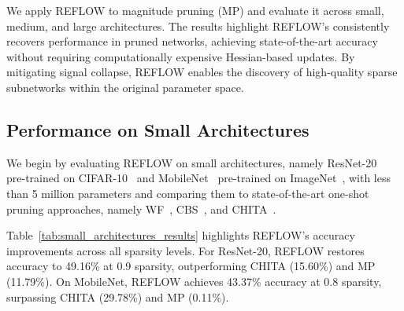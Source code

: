 We apply REFLOW to magnitude pruning (MP) and evaluate it across small, medium, and large architectures. The results highlight REFLOW’s consistently recovers performance in pruned networks, achieving state-of-the-art accuracy without requiring computationally expensive Hessian-based updates. By mitigating signal collapse, REFLOW enables the discovery of high-quality sparse subnetworks within the original parameter space.

\subsection{Performance on Small Architectures}
We begin by evaluating REFLOW on small architectures, namely ResNet-20~\cite{RESNET} pre-trained on CIFAR-10~\cite{CIFAR10} and MobileNet~\cite{MobileNet} pre-trained on ImageNet~\cite{ImageNet}, with less than 5 million parameters and comparing them to state-of-the-art one-shot pruning approaches, namely WF~\cite{WoodFisher}, CBS~\cite{CBS}, and CHITA~\cite{CHITA}. 

Table~\ref{tab:small_architectures_results} highlights REFLOW’s accuracy improvements across all sparsity levels. For ResNet-20, REFLOW restores accuracy to 49.16\% at 0.9 sparsity, outperforming CHITA (15.60\%) and MP (11.79\%). On MobileNet, REFLOW achieves 43.37\% accuracy at 0.8 sparsity, surpassing CHITA (29.78\%) and MP (0.11\%). 

